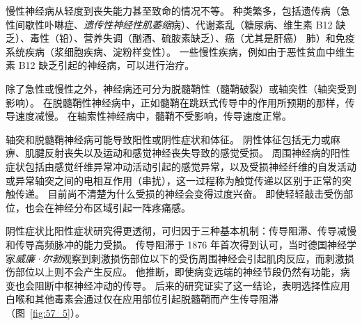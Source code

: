 慢性神经病从轻度到丧失能力甚至致命的情况不等。
种类繁多，包括遗传病（急性间歇性卟啉症、\textit{遗传性神经性肌萎缩}病）、代谢紊乱（糖尿病、维生素 B12 缺乏）、毒性（铅）、营养失调（酗酒、硫胺素缺乏）、癌（尤其是肝癌） 肺）和免疫系统疾病（浆细胞疾病、淀粉样变性）。
一些慢性疾病，例如由于恶性贫血中维生素 B12 缺乏引起的神经病，可以进行治疗。


除了急性或慢性之外，神经病还可分为脱髓鞘性（髓鞘破裂）或轴突性（轴突受到影响）。
在脱髓鞘性神经病中，正如髓鞘在跳跃式传导中的作用所预期的那样，传导速度减慢。
在轴索性神经病中，髓鞘不受影响，传导速度正常。


轴突和脱髓鞘神经病可能导致阳性或阴性症状和体征。
阴性体征包括无力或麻痹、肌腱反射丧失以及运动和感觉神经丧失导致的感觉受损。
周围神经病的阳性症状包括由感觉纤维异常冲动活动引起的感觉异常，以及受损神经纤维的自发活动或异常轴突之间的电相互作用（串扰），这一过程称为触觉传递以区别于正常的突触传递。
目前尚不清楚为什么受损的神经会变得过度兴奋。
即使轻轻敲击受伤部位，也会在神经分布区域引起一阵疼痛感。


阴性症状比阳性症状研究得更透彻，可归因于三种基本机制：传导阻滞、传导减慢和传导高频脉冲的能力受损。
传导阻滞于 1876 年首次得到认可，当时德国神经学家\textit{威廉·尔勃}观察到刺激损伤部位以下的受伤周围神经会引起肌肉反应，而刺激损伤部位以上则不会产生反应。
他推断，即使病变远端的神经节段仍然有功能，病变也会阻断中枢神经冲动的传导。
后来的研究证实了这一结论，表明选择性应用白喉和其他毒素会通过仅在应用部位引起脱髓鞘而产生传导阻滞（图~\ref{fig:57_5}）。


